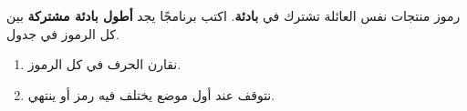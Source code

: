 \begin{statement}
رموز منتجات نفس العائلة تشترك في \textbf{بادئة}. اكتب برنامجًا يجد \textbf{أطول بادئة مشتركة} بين كل الرموز في جدول.
\end{statement}
\begin{stepsbox}\begin{enumerate}
\item نقارن الحرف  في كل الرموز.
\item نتوقف عند أول موضع يختلف فيه رمز أو ينتهي.
\end{enumerate}\end{stepsbox}
